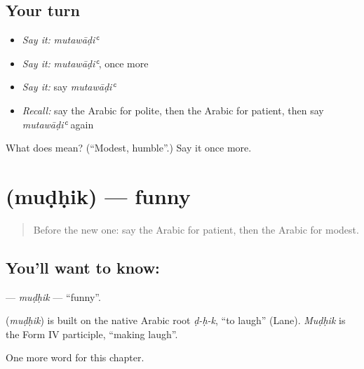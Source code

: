 \subsection*{Your turn}
\begin{itemize}
\raggedright
  \item \emph{Say it:} \emph{mutawāḍiʿ}
  \item \emph{Say it:} \emph{mutawāḍiʿ}, once more
  \item \emph{Say it:} say \emph{mutawāḍiʿ}
  \item \emph{Recall:} say the Arabic for polite, then the Arabic for patient, then say \emph{mutawāḍiʿ} again
\end{itemize}

\begin{tcolorbox}[breakable,colback=teal!4,colframe=teal!35!black,title={Before you move on}]
What does  mean? (\textquotedblleft{}Modest, humble\textquotedblright{}.) Say it once more.
\end{tcolorbox}
\section[\texorpdfstring{\ar{مضحك} (muḍḥik)}{مضحك (muḍḥik)}]{ (muḍḥik) — funny}

\label{lesson:AR-C241-mudhik}



\begin{quote}
Before the new one: say the Arabic for patient, then the Arabic for modest.
\end{quote}

\subsection*{You'll want to know: }
\textbf{} — \emph{muḍḥik} — \textquotedblleft{}funny\textquotedblright{}.

\begin{cousinweb}
\textbf{} (\emph{muḍḥik}) is built on the native Arabic root \emph{ḍ-ḥ-k}, \textquotedblleft{}to laugh\textquotedblright{} (Lane). \emph{Muḍḥik} is the Form IV participle, \textquotedblleft{}making laugh\textquotedblright{}.
\end{cousinweb}

\begin{grammarlens}[title={What you've built}]
One more word for this chapter.
\end{grammarlens}

